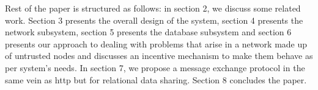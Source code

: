 \documentclass[preprint,10pt]{elsarticle}
\theoremstyle{definition}
\begin{document}
Rest of the paper is structured as follows: in section 2, we discuss some related work. Section 3 presents the overall design of the system, section 4 presents the network subsystem, section 5 presents the database subsystem and section 6 presents our approach to dealing with problems that arise in a network made up of untrusted nodes and discusses an incentive mechanism to make them behave as per system's needs. In section 7, we propose a message exchange protocol in the same vein as http but for relational data sharing. Section 8 concludes the paper.











\end{document}
